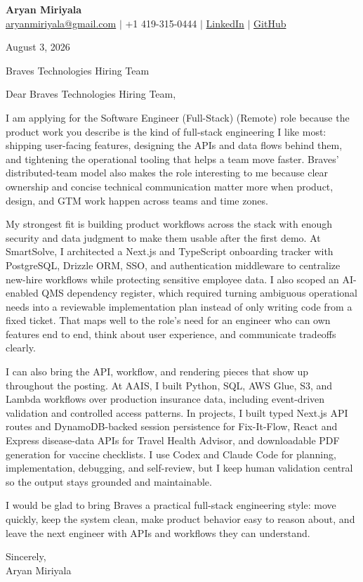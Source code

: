 \documentclass[letterpaper,11pt]{article}
\begin{document}
{\Large\textbf{Aryan Miriyala}}\\
\href{mailto:aryanmiriyala@gmail.com}{aryanmiriyala@gmail.com} $|$ +1 419-315-0444 $|$
\href{https://www.linkedin.com/in/aryan-miriyala-7788a21b6/}{LinkedIn} $|$
\href{https://github.com/aryanmiriyala}{GitHub}

August 3, 2026

Braves Technologies Hiring Team

Dear Braves Technologies Hiring Team,

I am applying for the Software Engineer (Full-Stack) (Remote) role because the product work you describe is the kind of full-stack engineering I like most: shipping user-facing features, designing the APIs and data flows behind them, and tightening the operational tooling that helps a team move faster. Braves' distributed-team model also makes the role interesting to me because clear ownership and concise technical communication matter more when product, design, and GTM work happen across teams and time zones.

My strongest fit is building product workflows across the stack with enough security and data judgment to make them usable after the first demo. At SmartSolve, I architected a Next.js and TypeScript onboarding tracker with PostgreSQL, Drizzle ORM, SSO, and authentication middleware to centralize new-hire workflows while protecting sensitive employee data. I also scoped an AI-enabled QMS dependency register, which required turning ambiguous operational needs into a reviewable implementation plan instead of only writing code from a fixed ticket. That maps well to the role's need for an engineer who can own features end to end, think about user experience, and communicate tradeoffs clearly.

I can also bring the API, workflow, and rendering pieces that show up throughout the posting. At AAIS, I built Python, SQL, AWS Glue, S3, and Lambda workflows over production insurance data, including event-driven validation and controlled access patterns. In projects, I built typed Next.js API routes and DynamoDB-backed session persistence for Fix-It-Flow, React and Express disease-data APIs for Travel Health Advisor, and downloadable PDF generation for vaccine checklists. I use Codex and Claude Code for planning, implementation, debugging, and self-review, but I keep human validation central so the output stays grounded and maintainable.

I would be glad to bring Braves a practical full-stack engineering style: move quickly, keep the system clean, make product behavior easy to reason about, and leave the next engineer with APIs and workflows they can understand.

Sincerely,\\
Aryan Miriyala
\end{document}
